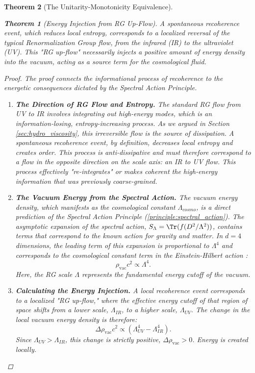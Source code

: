 \documentclass[11pt, letterpaper]{report}
\theoremstyle{plain} %
\newtheorem{theorem}{Theorem}[chapter]
\theoremstyle{definition} %
\theoremstyle{remark} %
\begin{document}
\begin{theorem}[The Unitarity-Monotonicity Equivalence]
\begin{theorem}[Energy Injection from RG Up-Flow]
\label{thm:energy_from_rg_upflow}
A spontaneous recoherence event, which reduces local entropy, corresponds to a localized reversal of the typical Renormalization Group flow, from the infrared (IR) to the ultraviolet (UV). This "RG up-flow" necessarily injects a positive amount of energy density into the vacuum, acting as a source term for the cosmological fluid.
\end{theorem}
\begin{proof}
The proof connects the informational process of recoherence to the energetic consequences dictated by the Spectral Action Principle.
\begin{enumerate}
    \item \textbf{The Direction of RG Flow and Entropy.} The standard RG flow from UV to IR involves integrating out high-energy modes, which is an information-losing, entropy-increasing process. As we argued in Section \ref{sec:hydro_viscosity}, this irreversible flow is the source of dissipation. A spontaneous recoherence event, by definition, decreases local entropy and creates order. This process is anti-dissipative and must therefore correspond to a flow in the opposite direction on the scale axis: an IR to UV flow. This process effectively "re-integrates" or makes coherent the high-energy information that was previously coarse-grained.

    \item \textbf{The Vacuum Energy from the Spectral Action.} The vacuum energy density, which manifests as the cosmological constant $\Lambda_{cosmo}$, is a direct prediction of the Spectral Action Principle (\cref{principle:spectral_action}). The asymptotic expansion of the spectral action, $S_{\Lambda} = \Tr(f(D^2/\Lambda^2))$, contains terms that correspond to the known action for gravity and matter. In $d=4$ dimensions, the leading term of this expansion is proportional to $\Lambda^4$ and corresponds to the cosmological constant term in the Einstein-Hilbert action \cite{Chamseddine1997SpectralAction}:
    \begin{equation}
        \rho_{\text{vac}} c^2 \propto \Lambda^4.
    \end{equation}
    Here, the RG scale $\Lambda$ represents the fundamental energy cutoff of the vacuum.

    \item \textbf{Calculating the Energy Injection.} A local recoherence event corresponds to a localized "RG up-flow," where the effective energy cutoff of that region of space shifts from a lower scale, $\Lambda_{IR}$, to a higher scale, $\Lambda_{UV}$. The change in the local vacuum energy density is therefore:
    \begin{equation}
        \Delta \rho_{\text{vac}} c^2 \propto (\Lambda_{UV}^4 - \Lambda_{IR}^4).
    \end{equation}
    Since $\Lambda_{UV} > \Lambda_{IR}$, this change is strictly positive, $\Delta \rho_{\text{vac}} > 0$. Energy is created locally.


\end{enumerate}
\end{proof}
\end{theorem}
\end{document}

